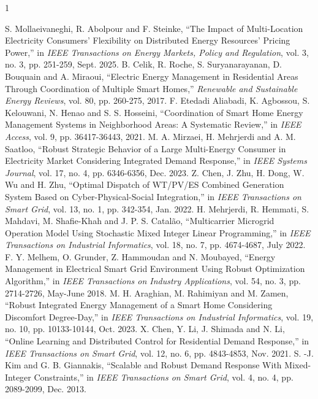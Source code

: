 \documentclass[journal]{IEEEtran}
\begin{document}
\begin{thebibliography}{1}



S. Mollaeivaneghi, R. Abolpour and F. Steinke, ``The Impact of Multi-Location Electricity Consumers' Flexibility on Distributed Energy Resources' Pricing Power,'' in \textit{IEEE Transactions on Energy Markets, Policy and Regulation}, vol. 3, no. 3, pp. 251-259, Sept. 2025.
B. Celik, R. Roche, S. Suryanarayanan, D. Bouquain and A. Miraoui, ``Electric Energy Management in Residential Areas Through Coordination of Multiple Smart Homes,'' \textit{Renewable and Sustainable Energy Reviews}, vol. 80, pp. 260-275, 2017.
F. Etedadi Aliabadi, K. Agbossou, S. Kelouwani, N. Henao and S. S. Hosseini, ``Coordination of Smart Home Energy Management Systems in Neighborhood Areas: A Systematic Review,'' in \textit{IEEE Access}, vol. 9, pp. 36417-36443, 2021.
M. A. Mirzaei, H. Mehrjerdi and A. M. Saatloo, ``Robust Strategic Behavior of a Large Multi-Energy Consumer in Electricity Market Considering Integrated Demand Response,'' in \textit{IEEE Systems Journal}, vol. 17, no. 4, pp. 6346-6356, Dec. 2023.
Z. Chen, J. Zhu, H. Dong, W. Wu and H. Zhu, ``Optimal Dispatch of WT/PV/ES Combined Generation System Based on Cyber-Physical-Social Integration,'' in \textit{IEEE Transactions on Smart Grid}, vol. 13, no. 1, pp. 342-354, Jan. 2022.
H. Mehrjerdi, R. Hemmati, S. Mahdavi, M. Shafie-Khah and J. P. S. Catalão, ``Multicarrier Microgrid Operation Model Using Stochastic Mixed Integer Linear Programming,'' in \textit{IEEE Transactions on Industrial Informatics}, vol. 18, no. 7, pp. 4674-4687, July 2022.
F. Y. Melhem, O. Grunder, Z. Hammoudan and N. Moubayed, ``Energy Management in Electrical Smart Grid Environment Using Robust Optimization Algorithm,'' in \textit{IEEE Transactions on Industry Applications}, vol. 54, no. 3, pp. 2714-2726, May-June 2018.
M. H. Araghian, M. Rahimiyan and M. Zamen, ``Robust Integrated Energy Management of a Smart Home Considering Discomfort Degree-Day,'' in \textit{IEEE Transactions on Industrial Informatics}, vol. 19, no. 10, pp. 10133-10144, Oct. 2023.
X. Chen, Y. Li, J. Shimada and N. Li, ``Online Learning and Distributed Control for Residential Demand Response,'' in \textit{IEEE Transactions on Smart Grid}, vol. 12, no. 6, pp. 4843-4853, Nov. 2021.
S. -J. Kim and G. B. Giannakis, ``Scalable and Robust Demand Response With Mixed-Integer Constraints,'' in \textit{IEEE Transactions on Smart Grid}, vol. 4, no. 4, pp. 2089-2099, Dec. 2013.

\end{thebibliography}
\end{document}

